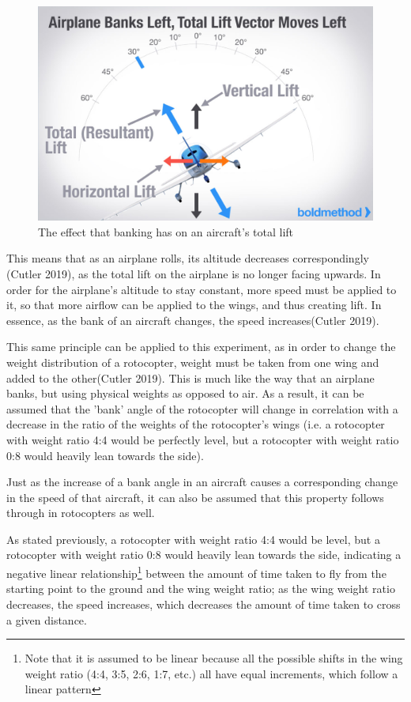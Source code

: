 \documentclass[]{article}
\theoremstyle{definition}
\begin{document}
\begin{figure}[H]
    \centering
    \includegraphics[scale=0.25]{graphics/bank-left.jpg}
    \caption{The effect that banking has on an aircraft's total lift}
    \label{Banking Lift}
\end{figure}

This means that as an airplane rolls, its altitude decreases correspondingly (Cutler 2019), as the total lift on the airplane is no longer facing upwards. In order for the airplane's altitude to stay constant, more speed must be applied to it, so that more airflow can be applied to the wings, and thus creating lift. In essence, as the bank of an aircraft changes, the speed increases(Cutler 2019). 

This same principle can be applied to this experiment, as in order to change the weight distribution of a rotocopter, weight must be taken from one wing and added to the other(Cutler 2019). This is much like the way that an airplane banks, but using physical weights as opposed to air. As a result, it can be assumed that the 'bank' angle of the rotocopter will change in correlation with a decrease in the ratio of the weights of the rotocopter's wings (i.e. a rotocopter with weight ratio 4:4 would be perfectly level, but a rotocopter with weight ratio 0:8 would heavily lean towards the side).

Just as the increase of a bank angle in an aircraft causes a corresponding change in the speed of that aircraft, it can also be assumed that this property follows through in rotocopters as well.

As stated previously, a rotocopter with weight ratio 4:4 would be level, but a rotocopter with weight ratio 0:8 would heavily lean towards the side, indicating a negative linear relationship\footnote{Note that it is assumed to be linear because all the possible shifts in the wing weight ratio (4:4, 3:5, 2:6, 1:7, etc.) all have equal increments, which follow a linear pattern} between the amount of time taken to fly from the starting point to the ground and the wing weight ratio; as the wing weight ratio decreases, the speed increases, which decreases the amount of time taken to cross a given distance.
\end{document}

